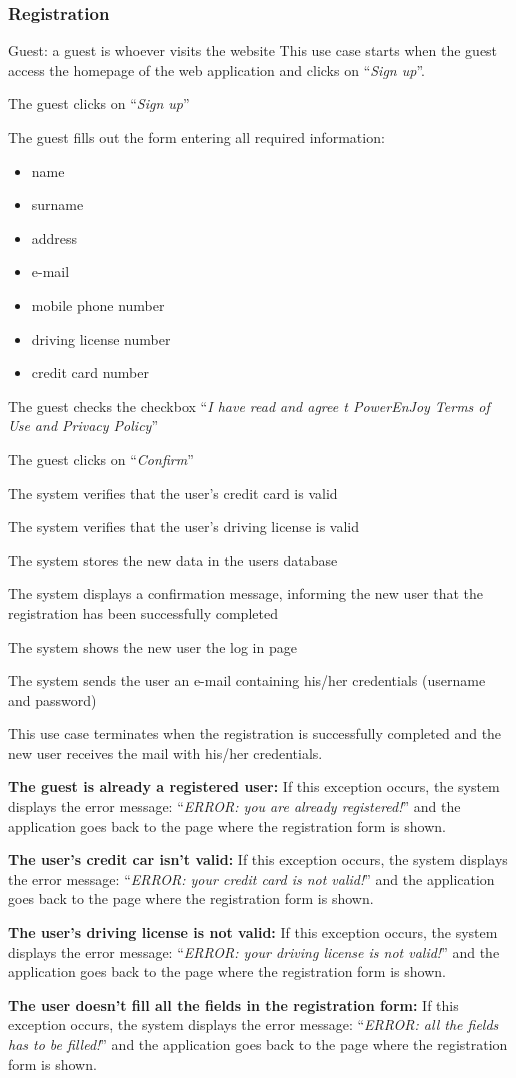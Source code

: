 \newcommand{\Event}[1]{
	\item #1
}

\newcommand{\Exc}[2]{
	\item \textbf{#1:} #2
	
}


\subsubsection{Registration}
\toggletrue{exception}
\begin{UseCase}
	{Guest: a guest is whoever visits the website}
	{This use case starts when the guest access the homepage of the web application and clicks on ``\textit{Sign up}''.}
	{
		\Event{The guest clicks on ``\textit{Sign up}''}
		\Event{The guest fills out the form entering all required information:
			\begin{itemize}
				\item name
				\item surname
				\item address
				\item e-mail
				\item mobile phone number
				\item driving license number
				\item credit card number
		\end{itemize}}
		\Event{The guest checks the checkbox ``\textit{I have read and agree t PowerEnJoy Terms of Use and Privacy Policy}''}
		\Event{The guest clicks on ``\textit{Confirm}''}
		\Event{The system verifies that the user's credit card is valid}
		\Event{The system verifies that the user's driving license is valid}
		\Event{The system stores the new data in the users database}
		\Event{The system displays a confirmation message, informing the new user that the registration has been successfully completed}
		\Event{The system shows the new user the log in page}
		\Event{The system sends the user an e-mail containing his/her credentials (username and password)}
	}
	{This use case terminates when the registration is successfully completed and the new user receives the mail with his/her credentials.}
	{
		\Exc{The guest is already a registered user}{If this exception occurs, the system displays the error message: ``\textit{ERROR: you are already registered!}'' and the application goes back to the page where the registration form is shown.}
		\Exc{The user's credit car isn't valid}{If this exception occurs, the system displays the error message: ``\textit{ERROR: your credit card is not valid!}'' and the application goes back to the page where the registration form is shown.}
		\Exc{The user's driving license is not valid}{If this exception occurs, the system displays the error message: ``\textit{ERROR: your driving license is not valid!}'' and the application goes back to the page where the registration form is shown.}
		\Exc{The user doesn't fill all the fields in the registration form}{If this exception occurs, the system displays the error message: ``\textit{ERROR: all the fields has to be filled!}'' and the application goes back to the page where the registration form is shown.}
	}
\end{UseCase}


